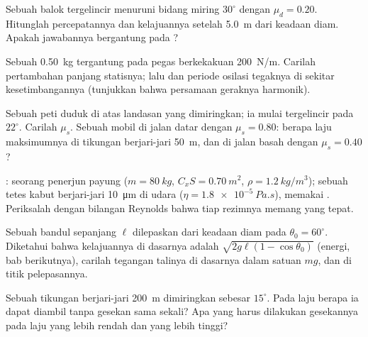 \begin{exercise}[$\star$]\label{exo:b1:newton-dynamics:3}
Sebuah balok tergelincir menuruni bidang miring $30^\circ$ dengan
$\mu_d = 0.20$. Hitunglah percepatannya dan kelajuannya setelah
\qty{5.0}{m} dari keadaan diam. Apakah jawabannya bergantung pada ?
\end{exercise}

\begin{exercise}[$\star$]\label{exo:b1:newton-dynamics:4}
Sebuah  \qty{0.50}{kg} tergantung pada pegas berkekakuan
\qty{200}{N/m}. Carilah pertambahan panjang statisnya; lalu  dan periode osilasi tegaknya di sekitar kesetimbangannya
(tunjukkan bahwa persamaan geraknya harmonik).
\end{exercise}

\begin{exercise}[$\star\star$]\label{exo:b1:newton-dynamics:5}
Sebuah peti duduk di atas landasan yang dimiringkan; ia mulai
tergelincir pada $22^\circ$. Carilah $\mu_s$. Sebuah mobil di jalan
datar dengan $\mu_s = 0.80$: berapa laju maksimumnya di tikungan
berjari-jari \qty{50}{m}, dan di jalan basah dengan $\mu_s = 0.40$?
\end{exercise}

\begin{exercise}[$\star\star$]\label{exo:b1:newton-dynamics:6}
: seorang penerjun payung ($m = \qty{80}{kg}$, $C_xS = \qty{0.70}{m^2}$,
$\rho = \qty{1.2}{kg/m^3}$); sebuah tetes kabut berjari-jari \qty{10}{\micro m}
di udara ($\eta = \qty{1.8e-5}{Pa.s}$), memakai . Periksalah
dengan bilangan Reynolds bahwa tiap rezimnya memang yang tepat.
\end{exercise}

\begin{exercise}[$\star\star$]\label{exo:b1:newton-dynamics:7}
Sebuah bandul sepanjang $\ell$ dilepaskan dari keadaan diam pada
$\theta_0 = 60^\circ$. Diketahui bahwa kelajuannya di dasarnya adalah
$\sqrt{2g\ell(1 - \cos\theta_0)}$ (energi, bab berikutnya), carilah
tegangan talinya di dasarnya dalam satuan $mg$, dan di titik pelepasannya.
\end{exercise}

\begin{exercise}[$\star\star$]\label{exo:b1:newton-dynamics:8}
Sebuah tikungan berjari-jari \qty{200}{m} dimiringkan sebesar $15^\circ$.
Pada laju berapa ia dapat diambil tanpa gesekan sama sekali? Apa yang
harus dilakukan gesekannya pada laju yang lebih rendah dan yang lebih tinggi?
\end{exercise}

